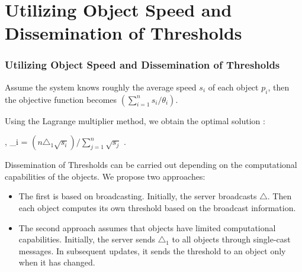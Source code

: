 \documentclass{beamer}
\begin{document}
\section{Utilizing Object Speed and Dissemination of Thresholds}
\begin{frame}
\frametitle{Utilizing Object Speed and Dissemination of Thresholds}
\item Assume the system knows roughly the average speed $s_{i}$ of each object $p_{i}$, then the objective function becomes   $(\sum\limits_{i=1}^n s_i/\theta_i) $. 
\item Using the Lagrange multiplier method, we obtain the optimal solution :
\item {}, \theta_i = $({n}\triangle_{1} \sqrt{s_{i}})/\sum\limits_{j=1}^n \sqrt{s_{j}}$ .
\item  Dissemination of Thresholds can be carried out depending on the computational capabilities of the objects. We propose two approaches:
\begin{itemize}
    \item The first is
based on broadcasting. Initially, the
server broadcasts $\triangle$. Then each object
computes its own threshold based on the broadcast
information.
    \item The second approach assumes that objects have limited
computational capabilities. Initially, the server sends $\triangle_{1}$ to
all objects through single-cast messages. In subsequent
updates, it sends the threshold to an object only when it has
changed.
\end{itemize}


\end{frame}


\end{document}
